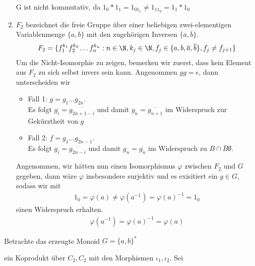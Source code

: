\begin{solution}
\begin{enumerate}
  G ist nicht kommutativ, da $1_0*1_1 = 1_01_1 \neq 1_11_0 = 1_1*1_0$
  \item $F_2$ bezeichnet die freie Gruppe über einer beliebigen zwei-elementigen
  Variablenmenge $\{a,b\}$ mit den zugehörigen Inversen $\{\overline{a},\overline{b}\}$.
  \begin{align*}
    F_2 = \{f_1^{k_1}f_2^{k_2}\dots f_n^{k_n}: n \in \N,k_j \in \N, f_j \in
    \{a,b,\overline{a},\overline{b}\}, f_j \neq f_{j+1}\}
  \end{align*}
  Um die Nicht-Isomorphie zu zeigen, bemerken wir zuerst, dass kein Element aus $F_2$
  zu sich selbst invers sein kann. Angenommen $gg = \epsilon$, dann unterscheiden wir
  \begin{itemize}
    \item Fall 1: $g = g_1\dots g_{2n}$.\\
    Es folgt $g_i = \overline{g_{2n+1-i}}$ und damit $g_{n} = \overline{g_{n+1}}$
    im Widerspruch zur Gekürztheit von $g$
    \item Fall 2: $f = g_1\dots g_{2n-1}$. \\
    Es folgt $g_i = \overline{g_{2n-i}}$ und damit $g_{n} = \overline{g_n}$
    im Widerspruch zu $B \cap \overline{B} \emptyset$.
  \end{itemize}
  Angenommen, wir hätten nun einen Isomorphismus $\varphi$ zwischen $F_2$ und $G$
  gegeben, dann wäre $\varphi$ insbesondere surjektiv und es exisitiert ein $g \in G$,
  sodass wir mit
  \begin{align*}
    1_0 = \varphi(a) \neq \varphi(a^{-1}) = \varphi(a)^{-1} = 1_0
  \end{align*}
  einen Widerspruch erhalten.
  \begin{align*}
    \varphi(a^{-1}) = \varphi(a)^{-1} = \varphi(a)
  \end{align*}
\end{enumerate}
Betrachte das erzeugte Monoid $G = \{a,b\}^*$

ein Koprodukt über $C_2, C_2$ mit den Morphismen $\iota_1,\iota_2$.
Sei
\end{solution}
